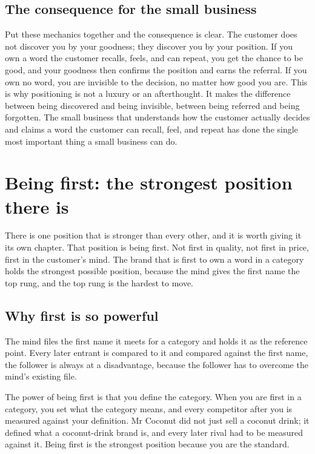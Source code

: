\documentclass[10pt,twoside,openany]{memoir}
\newcommand{\needspacehead}{\needspace{4\baselineskip}}
\let\oldsection\section
\renewcommand{\section}{\needspacehead\oldsection}
\begin{document}
\section{The consequence for the small
business}\label{the-consequence-for-the-small-business}

Put these mechanics together and the consequence is clear. The customer
does not discover you by your goodness; they discover you by your
position. If you own a word the customer recalls, feels, and can repeat,
you get the chance to be good, and your goodness then confirms the
position and earns the referral. If you own no word, you are invisible
to the decision, no matter how good you are. This is why positioning is
not a luxury or an afterthought. It makes the difference between being
discovered and being invisible, between being referred and being
forgotten. The small business that understands how the customer actually
decides and claims a word the customer can recall, feel, and repeat has
done the single most important thing a small business can do.

\FloatBarrier
\chapter{Being first: the strongest position there
is}\label{being-first-the-strongest-position-there-is}

There is one position that is stronger than every other, and it is worth
giving it its own chapter. That position is being first. Not first in
quality, not first in price, first in the customer's mind. The brand
that is first to own a word in a category holds the strongest possible
position, because the mind gives the first name the top rung, and the
top rung is the hardest to move.

\section{Why first is so powerful}\label{why-first-is-so-powerful}

The mind files the first name it meets for a category and holds it as
the reference point. Every later entrant is compared to it and compared
against the first name, the follower is always at a disadvantage,
because the follower has to overcome the mind's existing file.

The power of being first is that you define the category. When you are
first in a category, you set what the category means, and every
competitor after you is measured against your definition. Mr Coconut did
not just sell a coconut drink; it defined what a coconut-drink brand is,
and every later rival had to be measured against it. Being first is the
strongest position because you are the standard.
\end{document}
